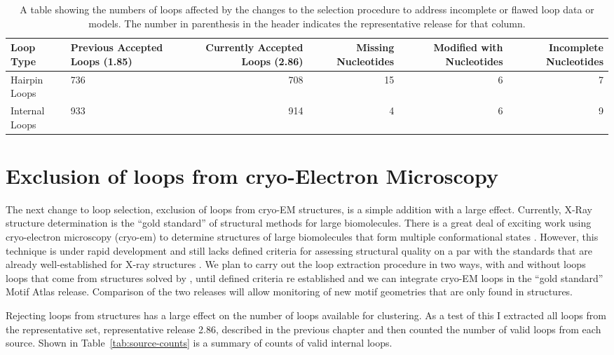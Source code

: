 \begin{table}
  \begin{tabulary}{\linewidth}{LLRRRR}
    \toprule
    Loop Type &
      Previous Accepted Loops (1.85) &
      Currently Accepted Loops (2.86) &
      Missing Nucleotides &
      Modified with Nucleotides &
      Incomplete Nucleotides \\
    \midrule
    Hairpin Loops  & 736 & 708 & 15 & 6 & 7 \\
    Internal Loops & 933 & 914 & 4  & 6 & 9 \\
    \bottomrule
  \end{tabulary}
  \caption{A table showing the numbers of loops affected by the changes to the
    selection procedure to address incomplete or flawed loop data or models. The
    number in parenthesis in the header indicates the representative release
    for that column.}
  \label{tab:loop-quality-changes}
\end{table}

\section{Exclusion of loops from cryo-Electron Microscopy}

The next change to loop selection, exclusion of loops from cryo-EM structures,
is a simple addition with a large effect. Currently, X-Ray structure
determination is the ``gold standard'' of structural methods for large
biomolecules. There is a great deal of exciting work using cryo-electron
microscopy (cryo-em) to determine structures of large biomolecules that form
multiple conformational states \cite{Amunts2014, Quade2015, Schureck2016}.
However, this technique is under rapid development and still lacks defined
criteria for assessing structural quality on a par with the standards that are
already well-established for X-ray structures \cite{Henderson2012}. We plan to
carry out the loop extraction procedure in two ways, with and without loops
loops that come from structures solved by \cyem, until defined criteria re
established and we can integrate cryo-EM loops in the ``gold standard'' Motif
Atlas release. Comparison of the two releases will allow monitoring of new
motif geometries that are only found in \cyem structures.

Rejecting loops from \cyem structures has a large effect on the number of loops
available for clustering. As a test of this I extracted all loops from the
representative set, representative release 2.86, described in the previous
chapter and then counted the number of valid loops from each source.  Shown in
Table~\ref{tab:source-counts} is a summary of counts of valid internal loops.

